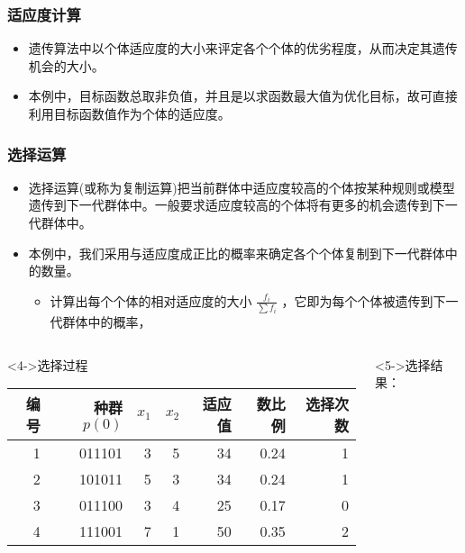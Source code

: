 \documentclass{beamer}
\begin{document}
\begin{frame}
\frametitle{适应度计算}
\label{sec-2-4}

\begin{itemize}
\item <2-> 遗传算法中以个体适应度的大小来评定各个个体的优劣程度，从而决定其遗传机会的大小。
\item <3-> 本例中，目标函数总取非负值，并且是以求函数最大值为优化目标，故可直接利用目标函数值作为个体的适应度。
\end{itemize}
\end{frame}
\begin{frame}
\frametitle{选择运算}
\label{sec-2-5}

\begin{itemize}
\item <2-> 选择运算(或称为复制运算)把当前群体中适应度较高的个体按某种规则或模型遗传到下一代群体中。一般要求适应度较高的个体将有更多的机会遗传到下一代群体中。
\item <3-> 本例中，我们采用与适应度成正比的概率来确定各个个体复制到下一代群体中的数量。
\begin{itemize}
\item 计算出每个个体的相对适应度的大小 $\frac{f_i}{\sum f_i}$ ，它即为每个个体被遗传到下一代群体中的概率，
\end{itemize}
\end{itemize}
\begin{columns}
\begin{column}{0.9\textwidth}
\begin{block}<4->{选择过程}
\label{sec-2-5-1}


\begin{center}
\begin{tabular}{rrrrrrr}
 编号  &  种群 $p(0)$  &  $x_1$  &  $x_2$  &  适应值  &  数比例  &  选择次数  \\
\hline
    1  &       011101  &      3  &      5  &      34  &    0.24  &         1  \\
    2  &       101011  &      5  &      3  &      34  &    0.24  &         1  \\
    3  &       011100  &      3  &      4  &      25  &    0.17  &         0  \\
    4  &       111001  &      7  &      1  &      50  &    0.35  &         2  \\
\end{tabular}
\end{center}
\end{block}
\end{column}
\begin{column}{0.15\textwidth}
\begin{block}<5->{选择结果：}
\label{sec-2-5-2}



\end{block}
\end{column}
\end{columns}
\end{frame}
\end{document}

